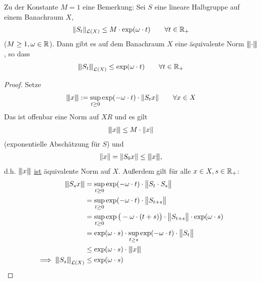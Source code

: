 \begin{bemerkung}
Zu der Konstante $M=1$ eine Bemerkung: Sei $S$ eine lineare Halbgruppe auf einem Banachraum $X$,
\begin{align*}
\Vert S_t\Vert_{\L(X)}\leq M\cdot\exp(\omega\cdot t)\qquad\forall t\in\R_+
\end{align*}
($M\geq1,\omega\in\R$). Dann gibt es auf dem Banachraum $X$ eine äquivalente Norm $\Vertiii{\cdot}$, so dass
\begin{align*}
\Vertiii{S_t}_{\L(X)}\leq\exp(\omega\cdot t)\qquad\forall t\in\R_+
\end{align*} 
\begin{proof}
Setze
\begin{align*}
\Vertiii{x}:=\sup\limits_{t\geq0}\exp(-\omega\cdot t)\cdot\Vert S_t x\Vert\qquad\forall x\in X
\end{align*}
Das ist offenbar eine Norm auf $XR$ und es gilt 
\begin{align*}
\Vertiii{x}\leq M\cdot\Vert x\Vert
\end{align*}
(exponentielle Abschätzung für $S$) und 
\begin{align*}
\Vert x\Vert=\Vert S_0 x\Vert\leq\Vertiii{x},
\end{align*}
d.h. $\Vertiii{x}$ \underline{ist} äquivalente Norm auf $X$. Außerdem gilt für alle $x\in X, s\in\R_+$:
\begin{align*}
\Vertiii{S_s x}
&=\sup\limits_{t\geq0}\exp(-\omega\cdot t)\cdot\big\Vert S_t\cdot S_s\big\Vert\\
&=\sup\limits_{t\geq0}\exp(-\omega\cdot t)\cdot\big\Vert S_{t+s}\big\Vert\\
&=\sup\limits_{t\geq0}\exp\big(-\omega\cdot(t+s)\big)\cdot\big\Vert S_{t+s}\big\Vert\cdot\exp(\omega\cdot s)\\
&=\exp(\omega\cdot s)\cdot\sup\limits_{t\geq s}\exp(-\omega\cdot t)\cdot\big\Vert S_{t}\big\Vert\\\
&\leq\exp(\omega\cdot s)\cdot\Vertiii{x}\\
\implies \Vertiii{S_s}_{\L(X)}&\leq\exp(\omega\cdot s)
\end{align*}
\end{proof}
\end{bemerkung}



